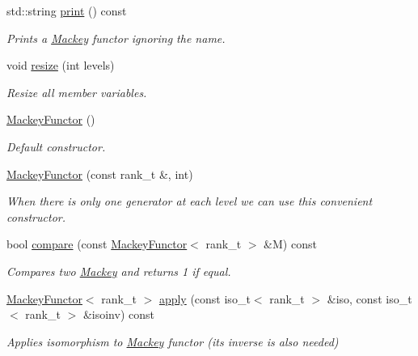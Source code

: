 \begin{DoxyCompactItemize}
\item 
std\+::string \hyperlink{classMackey_1_1MackeyFunctor_a3f694cd4f0a234be4531c21771772b50}{print} () const
\begin{DoxyCompactList}\small\item\em Prints a \hyperlink{namespaceMackey}{Mackey} functor ignoring the name. \end{DoxyCompactList}\item 
void \hyperlink{classMackey_1_1MackeyFunctor_a44d3104a47f23de5d8141b7800db6d11}{resize} (int levels)
\begin{DoxyCompactList}\small\item\em Resize all member variables. \end{DoxyCompactList}\item 
\hyperlink{classMackey_1_1MackeyFunctor_a075cd364217700d5f5c2459d4a988a93}{Mackey\+Functor} ()
\begin{DoxyCompactList}\small\item\em Default constructor. \end{DoxyCompactList}\item 
\hyperlink{classMackey_1_1MackeyFunctor_a7cdc1be794a7b39e7d4b86c2ad26355e}{Mackey\+Functor} (const rank\+\_\+t \&, int)
\begin{DoxyCompactList}\small\item\em When there is only one generator at each level we can use this convenient constructor. \end{DoxyCompactList}\item 
bool \hyperlink{classMackey_1_1MackeyFunctor_a001f4a56e79e68ca3fef808e6b0ccca4}{compare} (const \hyperlink{classMackey_1_1MackeyFunctor}{Mackey\+Functor}$<$ rank\+\_\+t $>$ \&M) const
\begin{DoxyCompactList}\small\item\em Compares two \hyperlink{namespaceMackey}{Mackey} and returns 1 if equal. \end{DoxyCompactList}\item 
\hyperlink{classMackey_1_1MackeyFunctor}{Mackey\+Functor}$<$ rank\+\_\+t $>$ \hyperlink{classMackey_1_1MackeyFunctor_a6522cfe1071ccb92ff3db38d89e14687}{apply} (const iso\+\_\+t$<$ rank\+\_\+t $>$ \&iso, const iso\+\_\+t$<$ rank\+\_\+t $>$ \&isoinv) const
\begin{DoxyCompactList}\small\item\em Applies isomorphism to \hyperlink{namespaceMackey}{Mackey} functor (its inverse is also needed) \end{DoxyCompactList}\item 

\end{DoxyCompactItemize}
